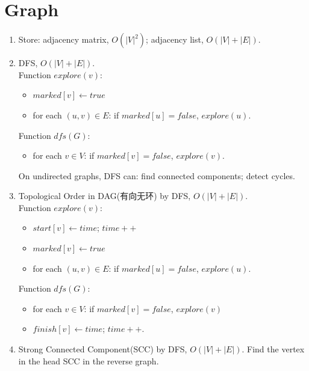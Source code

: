 \documentclass[10pt, a4paper, twocolumn]{article}
\begin{document}
\section{Graph}
\begin{enumerate}[leftmargin = 12pt, topsep = 0pt, itemsep=0pt, partopsep = 0pt]
    \item Store: adjacency matrix, $O(|V|^2)$; adjacency list, $O(|V|+|E|)$.
    \item DFS, $O(|V|+|E|)$.\\
        Function $explore(v)$:
        \begin{itemize}[leftmargin = 12pt, topsep = 0pt, itemsep=0pt, partopsep = 0pt]
        \item $marked[v]\leftarrow true$
        \item for each $(u,v)\in E$: if $marked[u]=false$, $explore(u)$.
        \end{itemize}
        Function $dfs(G):$
        \begin{itemize}[leftmargin = 12pt, topsep = 0pt, itemsep=0pt, partopsep = 0pt]
        \item for each $v\in V$: if $marked[v]=false$, $explore(v)$.
        \end{itemize}
        On undirected graphs, DFS can: find connected components; detect cycles.
    \item Topological Order in DAG(有向无环) by DFS, $O(|V|+|E|)$.\\
        Function $explore(v)$:
        \begin{itemize}[leftmargin = 12pt, topsep = 0pt, itemsep=0pt, partopsep = 0pt]
        \item $start[v]\leftarrow time$; $time++$
        \item $marked[v]\leftarrow true$
        \item for each $(u,v)\in E$: if $marked[u]=false$, $explore(u)$.
        \end{itemize}
        Function $dfs(G):$
        \begin{itemize}[leftmargin = 12pt, topsep = 0pt, itemsep=0pt, partopsep = 0pt]
        \item for each $v\in V$: if $marked[v]=false$, $explore(v)$
        \item $finish[v]\leftarrow time$; $time++$.
        \end{itemize}
    \item Strong Connected Component(SCC) by DFS, $O(|V|+|E|)$.
        Find the vertex in the head SCC in the reverse graph.
        \begin{itemize}[leftmargin = 12pt, topsep = 0pt, itemsep=0pt, partopsep = 0pt]

\end{itemize}
\end{enumerate}
\end{document}
